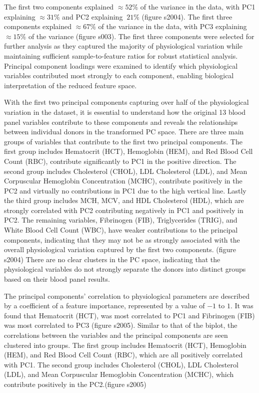 \documentclass[12pt,letterpaper]{article}
\begin{document}
The first two components explained $\approx 52\%$ of the variance in the data, with PC1 explaining $\approx 31\%$ and PC2 explaining $~21\%$ (figure s2004).
The first three components explained $\approx 67\%$ of the variance in the data, with PC3 explaining $\approx 15\%$ of the variance (figure s003). The first three components
were selected for further analysis as they captured the majority of physiological variation while maintaining sufficient sample-to-feature ratios for robust statistical analysis.
Principal component loadings were examined to identify which physiological variables contributed most strongly to each component, enabling biological interpretation of the reduced feature space.

With the first two principal components capturing over half of the physiological variation in the dataset, it is essential to understand how the original 13 blood panel variables contribute to
these components and reveals the relationships between individual donors in the transformed PC space. There are three main groups of variables that contribute to the first two principal components.
The first group includes Hematocrit (HCT), Hemoglobin (HEM), and Red Blood Cell Count (RBC), contribute significantly to PC1 in the positive direction. The second group includes Cholesterol (CHOL),
LDL Cholesterol (LDL), and Mean Corpuscular Hemoglobin Concentration (MCHC), contribute positively in the PC2 and virtually no contributions in PC1 due to the high vertical line.
Lastly the third group includes MCH, MCV, and HDL Cholesterol (HDL), which are strongly correlated with PC2 contributing negatively in PC1 and positively in PC2. The remaining variables, Fibrinogen (FIB),
Triglycerides (TRIG), and White Blood Cell Count (WBC), have weaker contributions to the principal components, indicating that they may not be as strongly associated with the overall physiological variation
captured by the first two components. (figure s2004) There are no clear clusters in the PC space, indicating that the physiological variables do not strongly separate the donors into distinct groups based
on their blood panel results.

The principal components' correlation to physiological parameters are described by a coefficient of a feature importance, represented by a value of $-1$ to $1$. It was found that Hematocrit (HCT),
was most correlated to PC1 and Fibrinogen (FIB) was most correlated to PC3 (figure s2005). Similar to that of the biplot, the correlations between the variables and the principal components are seen clustered into
groups. The first group includes Hematocrit (HCT), Hemoglobin (HEM), and Red Blood Cell Count (RBC), which are all positively correlated with PC1. The second group includes Cholesterol (CHOL), LDL Cholesterol (LDL),
and Mean Corpuscular Hemoglobin Concentration (MCHC), which contribute positively in the PC2.(figure s2005)
\end{document}
